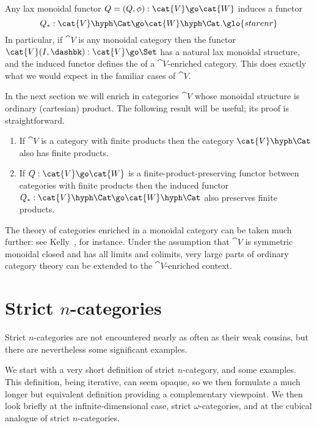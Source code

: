 Any lax monoidal functor $Q = (Q, \phi): \cat{V} \go \cat{W}$ induces a
functor
\[
Q_*: \cat{V}\hyph\Cat \go \cat{W}\hyph\Cat.%
% 
\glo{starenr}
%
\]
In particular, if $\cat{V}$ is any monoidal category then the functor
$\cat{V}(I, \dashbk): \cat{V} \go \Set$ has a natural lax monoidal
structure, and the induced functor defines the 
of a $\cat{V}$-enriched category.  This does exactly what we would expect
in the familiar cases of $\cat{V}$.

In the next section we will enrich in categories $\cat{V}$ whose monoidal
structure is ordinary (cartesian) product.  The following result will be
useful; its proof is straightforward.
%
\begin{propn}	
\begin{enumerate}
\item	{}
  If $\cat{V}$ is a category with finite products then the category
  $\cat{V}\hyph\Cat$ also has finite products.
\item	{}
  If $Q: \cat{V} \go \cat{W}$ is a finite-product-preserving functor
  between categories with finite products then the induced functor $Q_*:
  \cat{V}\hyph\Cat \go \cat{W}\hyph\Cat$ also preserves finite products.
\done
\end{enumerate}
\end{propn}

The theory of categories enriched in a monoidal category can be taken much
further: see Kelly~\cite{KelBCE}, for instance.  Under the assumption that
$\cat{V}$ is symmetric monoidal closed and has all limits and colimits,
very large parts of ordinary category theory can be extended to the
$\cat{V}$-enriched context.




\section{Strict $n$-categories}


Strict $n$-categories are not encountered nearly as often as their weak
cousins, but there are nevertheless some significant examples.

We start with a very short definition of strict $n$-category, and some
examples.  This definition, being iterative, can seem opaque, so we then
formulate a much longer but equivalent definition providing a complementary
viewpoint.  We then look briefly at the infinite-dimensional case, strict
$\omega$-categories, and at the cubical analogue of strict $n$-categories.

